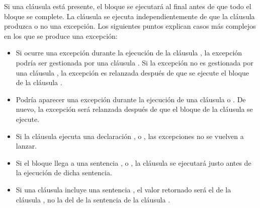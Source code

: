 \documentclass[a5paper,10pt,spanish]{sphinxmanual}
\begin{document}
\sphinxAtStartPar
Si una cláusula  está presente, el bloque  se ejecutará al final antes de que todo el bloque  se complete. La cláusula  se ejecuta independientemente de que la cláusula  produzca o no una excepción. Los siguientes puntos explican casos más complejos en los que se produce una excepción:
\begin{itemize}
\item {} 
\sphinxAtStartPar
Si ocurre una excepción durante la ejecución de la cláusula , la excepción podría ser gestionada por una cláusula . Si la excepción no es gestionada por una cláusula , la excepción es relanzada después de que se ejecute el bloque de la cláusula .

\item {} 
\sphinxAtStartPar
Podría aparecer una excepción durante la ejecución de una cláusula  o . De nuevo, la excepción será relanzada después de que el bloque de la cláusula  se ejecute.

\item {} 
\sphinxAtStartPar
Si la cláusula  ejecuta una declaración ,  o , las excepciones no se vuelven a lanzar.

\item {} 
\sphinxAtStartPar
Si el bloque  llega a una sentencia ,  o , la cláusula  se ejecutará justo antes de la ejecución de dicha sentencia.

\item {} 
\sphinxAtStartPar
Si una cláusula  incluye una sentencia , el valor retornado será el de la cláusula , no la del de la sentencia  de la cláusula .

\end{itemize}
\end{document}
